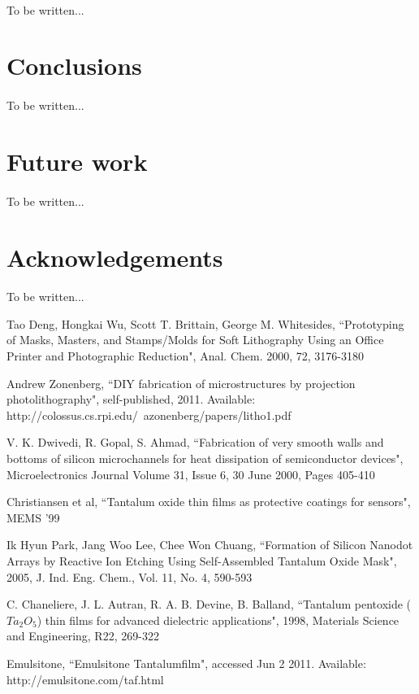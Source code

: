 \documentclass[twocolumn]{article}
\begin{document}
\paragraph*{}
To be written...

\section{Conclusions}
\paragraph*{}
To be written...

\section{Future work}
\paragraph*{}
To be written...

\section{Acknowledgements}
\paragraph*{}
To be written...

\begin{thebibliography}{99}
	Tao Deng, Hongkai Wu, Scott T. Brittain, George M. Whitesides, ``Prototyping of Masks, Masters,
	and Stamps/Molds for Soft Lithography Using an Office Printer and Photographic Reduction",
	Anal. Chem. 2000, 72, 3176-3180
	
	Andrew Zonenberg, ``DIY fabrication of microstructures by projection photolithography",
	self-published, 2011. Available: http://colossus.cs.rpi.edu/~azonenberg/papers/litho1.pdf
	
	V. K. Dwivedi, R. Gopal, S. Ahmad, ``Fabrication of very smooth walls and bottoms of silicon
	microchannels for heat dissipation of semiconductor devices", Microelectronics Journal
	Volume 31, Issue 6, 30 June 2000, Pages 405-410 
	
	Christiansen et al, ``Tantalum oxide thin films as protective coatings for sensors", MEMS '99
	
	Ik Hyun Park, Jang Woo Lee, Chee Won Chuang, ``Formation of Silicon Nanodot Arrays by Reactive
	Ion Etching Using Self-Assembled Tantalum Oxide Mask", 2005, J. Ind. Eng. Chem., Vol. 11, No. 4,
	590-593
	
	C. Chaneliere, J. L. Autran, R. A. B. Devine, B. Balland, ``Tantalum pentoxide ($Ta_2O_5$) thin
	films for advanced dielectric applications", 1998, Materials Science and Engineering, R22,
	269-322
	
	Emulsitone, ``Emulsitone Tantalumfilm", accessed Jun 2 2011. Available:
	http://emulsitone.com/taf.html
	
\end{thebibliography}
\end{document}
